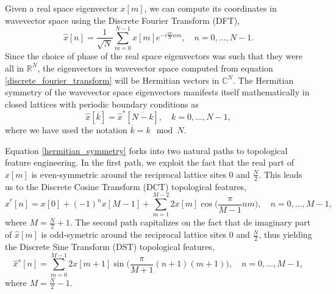 \documentclass[10pt]{revtex4-1}
\begin{document}


Given a real space eigenvector $x[m]$, we can compute its coordinates in wavevector space using the Discrete Fourier Transform (DFT),  
\begin{equation}
\label{discrete_fourier_transform}
\hat{x}[n] = \frac{1}{\sqrt{N}}\sum_{m=0}^{N-1}x[m]e^{-i\frac{2\pi}{N}nm}, \quad n=0,\dots,N-1.
\end{equation}
Since the choice of phase of the real space eigenvectors was such that they were all in $\mathbb{R}^{N}$, the eigenvectors in wavevector space computed from equation \eqref{discrete_fourier_transform} will be Hermitian vectors in $\mathbb{C}^N$. The Hermitian symmetry of the wavevector space eigenvectors manifests itself mathematically in closed lattices with periodic boundary conditions as 
\begin{equation}
\label{hermitian_symmetry}
\hat{x}[\overline{k}] = \hat{x}^*[\overline{N-k}], \quad k = 0,\dots, N-1,
\end{equation}
where  we have used the notation $\overline{k} = k \mod N$. 

Equation \eqref{hermitian_symmetry} forks into two natural paths to topological feature engineering. In the first path, we exploit the fact that the real part of $\hat{x}[m]$ is even-symmetric around the reciprocal lattice sites $0$ and $\frac{N}{2}$. This leads us to the Discrete Cosine Transform (DCT) topological features,
\begin{equation}
\label{DCT}
\hat{x}^{c}[n] = x[0] + (-1)^n x[M-1] + \sum_{m=1}^{M-2} 2x[m]\cos\bigg(\frac{\pi}{M-1}nm\bigg), \quad n=0,\dots,M-1, 
\end{equation}
where $M = \frac{N}{2}+1$. The second path capitalizes on the fact that de imaginary part of $\hat{x}[m]$ is odd-symetric around the reciprocal lattice sites $0$ and $\frac{N}{2}$, thus yielding the Discrete Sine Transform (DST) topological features,
\begin{equation}
\label{DST}
\hat{x}^{s}[n] = \sum_{m=0}^{M-1} 2x[m+1]\sin\bigg(\frac{\pi}{M+1}(n+1)(m+1)\bigg), \quad n=0,\dots,M-1,
\end{equation} 
where $M = \frac{N}{2}-1$. 
\end{document}
